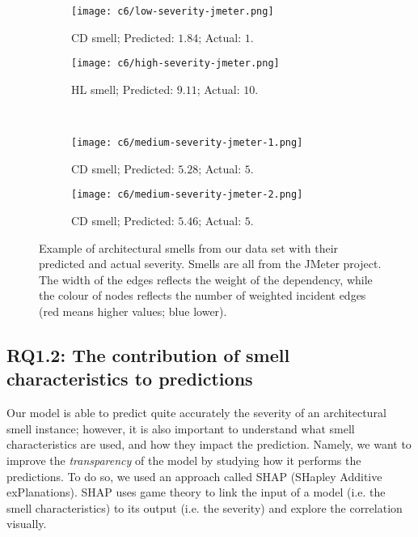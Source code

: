 \begin{figure}
    \centering
    \begin{subfigure}[b]{0.7\linewidth}
        \centering
        \texttt{[image: c6/low-severity-jmeter.png]}
        \caption{CD smell; Predicted: $1.84$; Actual: $1$.}
        \label{c6:fig:severity-low}
    \end{subfigure}
    \hfill
    \begin{subfigure}[b]{.8\linewidth}
        \centering
        \texttt{[image: c6/high-severity-jmeter.png]}
        \caption{HL smell; Predicted: $9.11$; Actual: $10$.}
        \label{c6:fig:severity-high}
    \end{subfigure}
    \\
    \begin{subfigure}[b]{.45\linewidth}
        \centering
        \texttt{[image: c6/medium-severity-jmeter-1.png]}
        \caption{CD smell; Predicted: $5.28$; Actual: $5$.}
        \label{c6:fig:severity-medium-1}
    \end{subfigure}
    \begin{subfigure}[b]{.45\linewidth}
        \centering
        \texttt{[image: c6/medium-severity-jmeter-2.png]}
        \caption{CD smell; Predicted: $5.46$; Actual: $5$.}
        \label{c6:fig:severity-medium-2}
    \end{subfigure}
       \caption{Example of architectural smells from our data set with their predicted and actual severity. Smells are all from the JMeter project. The width of the edges reflects the weight of the dependency, while the colour of nodes reflects the number of weighted incident edges (red means higher values; blue lower).}
       \label{c6:fig:severity-all}
\end{figure}

\subsection{RQ1.2: The contribution of smell characteristics to predictions}\label{c6:sec:explain-predictions}
Our model is able to predict quite accurately the severity of an architectural smell instance; however, it is also important to understand what smell characteristics are used, and how they impact the prediction. Namely, we want to improve the \emph{transparency} of the model by studying how it performs the predictions.
To do so, we used an approach called SHAP (SHapley Additive exPlanations). SHAP uses game theory to link the input of a model (i.e. the smell characteristics) to its output (i.e. the severity) \cite{Strumbelj2014} and explore the correlation visually.

